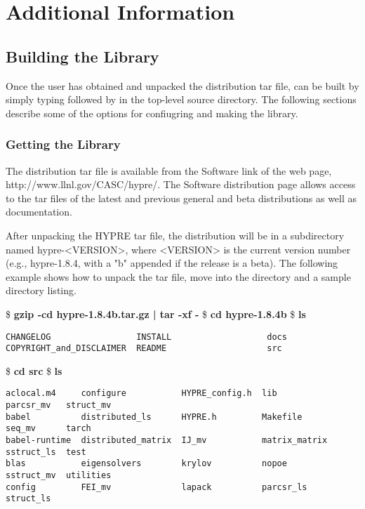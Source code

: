 \chapter{Additional Information}


\section{Building the Library}

Once the user has obtained and unpacked the distribution tar file, \hypre{} can be built
by simply typing  followed by  in the top-level source directory.
The following sections describe some of the options for confiugring and making the
\hypre{} library.

\subsection{Getting the Library}

The \hypre{} distribution tar file is available from the Software link of the
\hypre{} web page, 
{http://www.llnl.gov/CASC/hypre/}. 
The \hypre{} Software distribution page allows access to the tar files of the
latest and previous general and beta distributions as well as documentation. 

After unpacking the HYPRE tar file, the distribution will be in a 
subdirectory named hypre-<VERSION>, where <VERSION> is the current version number
(e.g., hypre-1.8.4, with a "b" appended if the release is a beta).
The following example shows how to unpack the tar file, move into the \hypre{}
directory and a sample directory listing.
\begin{ttfamily}
\begin{mdseries}
\linebreak
\$ \textbf{gzip -cd hypre-1.8.4b.tar.gz | tar -xf -}\linebreak
\$ \textbf{cd hypre-1.8.4b}\linebreak
\$ \textbf{ls}\linebreak
\begin{verbatim}
CHANGELOG                 INSTALL                   docs
COPYRIGHT_and_DISCLAIMER  README                    src
\end{verbatim}
\$ \textbf{cd src}\linebreak
\$ \textbf{ls}\linebreak
\begin{verbatim}
aclocal.m4     configure           HYPRE_config.h  lib            parcsr_mv   struct_mv
babel          distributed_ls      HYPRE.h         Makefile       seq_mv      tarch
babel-runtime  distributed_matrix  IJ_mv           matrix_matrix  sstruct_ls  test
blas           eigensolvers        krylov          nopoe          sstruct_mv  utilities
config         FEI_mv              lapack          parcsr_ls      struct_ls
\end{verbatim}
\end{mdseries}
\end{ttfamily}


